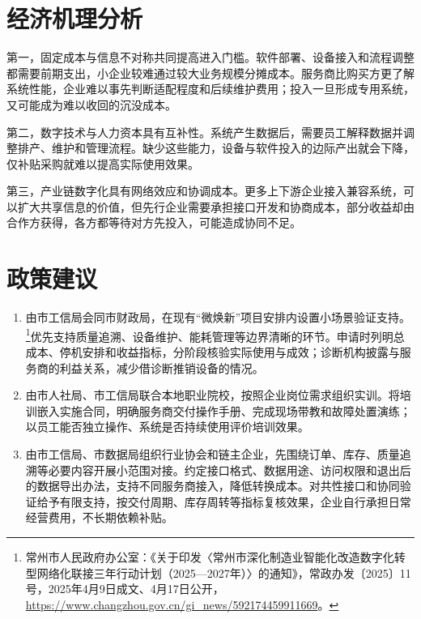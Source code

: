 \documentclass[UTF8,a4paper,12pt]{ctexart}
\begin{document}
\section{经济机理分析}
第一，固定成本与信息不对称共同提高进入门槛。软件部署、设备接入和流程调整都需要前期支出，小企业较难通过较大业务规模分摊成本。服务商比购买方更了解系统性能，企业难以事先判断适配程度和后续维护费用；投入一旦形成专用系统，又可能成为难以收回的沉没成本。

第二，数字技术与人力资本具有互补性。系统产生数据后，需要员工解释数据并调整排产、维护和管理流程。缺少这些能力，设备与软件投入的边际产出就会下降，仅补贴采购就难以提高实际使用效果。

第三，产业链数字化具有网络效应和协调成本。更多上下游企业接入兼容系统，可以扩大共享信息的价值，但先行企业需要承担接口开发和协商成本，部分收益却由合作方获得，各方都等待对方先投入，可能造成协同不足。

\section{政策建议}
\begin{enumerate}[label=\arabic*、,leftmargin=2em]
\item 由市工信局会同市财政局，在现有“微焕新”项目安排内设置小场景验证支持。\footnote{常州市人民政府办公室：《关于印发〈常州市深化制造业智能化改造数字化转型网络化联接三年行动计划（2025—2027年）〉的通知》，常政办发〔2025〕11号，2025年4月9日成文、4月17日公开，\url{https://www.changzhou.gov.cn/gi_news/592174459911669}。}优先支持质量追溯、设备维护、能耗管理等边界清晰的环节。申请时列明总成本、停机安排和收益指标，分阶段核验实际使用与成效；诊断机构披露与服务商的利益关系，减少借诊断推销设备的情况。
\item 由市人社局、市工信局联合本地职业院校，按照企业岗位需求组织实训。将培训嵌入实施合同，明确服务商交付操作手册、完成现场带教和故障处置演练；以员工能否独立操作、系统是否持续使用评价培训效果。
\item 由市工信局、市数据局组织行业协会和链主企业，先围绕订单、库存、质量追溯等必要内容开展小范围对接。约定接口格式、数据用途、访问权限和退出后的数据导出办法，支持不同服务商接入，降低转换成本。对共性接口和协同验证给予有限支持，按交付周期、库存周转等指标复核效果，企业自行承担日常经营费用，不长期依赖补贴。
\end{enumerate}
\end{document}
